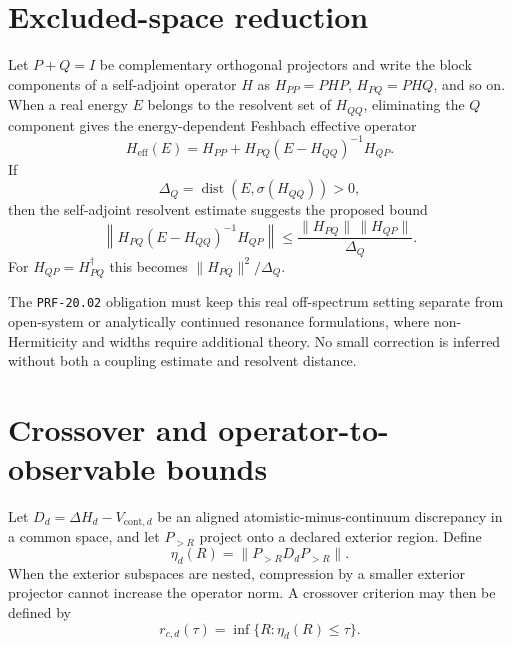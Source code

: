 \section{Excluded-space reduction}

Let $P+Q=I$ be complementary orthogonal projectors and write the block
components of a self-adjoint operator $H$ as $H_{PP}=PHP$,
$H_{PQ}=PHQ$, and so on. When a real energy $E$ belongs to the resolvent set of
$H_{QQ}$, eliminating the $Q$ component gives the energy-dependent Feshbach
effective operator~\cite{feshbach1958,feshbach1962}
\begin{equation}
  H_{\mathrm{eff}}(E)
  =
  H_{PP}+H_{PQ}(E-H_{QQ})^{-1}H_{QP}.
\end{equation}
If
\begin{equation}
  \Delta_Q=\operatorname{dist}(E,\sigma(H_{QQ}))>0,
\end{equation}
then the self-adjoint resolvent estimate suggests the proposed bound
\begin{equation}
  \left\|
    H_{PQ}(E-H_{QQ})^{-1}H_{QP}
  \right\|
  \leq
  \frac{\|H_{PQ}\|\,\|H_{QP}\|}{\Delta_Q}.
\end{equation}
For $H_{QP}=H_{PQ}^{\dagger}$ this becomes
$\|H_{PQ}\|^2/\Delta_Q$.

The \texttt{PRF-20.02} obligation must keep this real off-spectrum setting
separate from open-system or analytically continued resonance formulations,
where non-Hermiticity and widths require additional theory. No small correction
is inferred without both a coupling estimate and resolvent distance.

\section{Crossover and operator-to-observable bounds}

Let $D_d=\Delta H_d-V_{\mathrm{cont},d}$ be an aligned atomistic-minus-continuum
discrepancy in a common space, and let $P_{>R}$ project onto a declared exterior
region. Define
\begin{equation}
  \eta_d(R)
  =
  \|P_{>R}D_dP_{>R}\|.
\end{equation}
When the exterior subspaces are nested, compression by a smaller exterior
projector cannot increase the operator norm. A crossover criterion may then be
defined by
\begin{equation}
  r_{c,d}(\tau)
  =
  \inf\{R:\eta_d(R)\leq\tau\}.
\end{equation}

